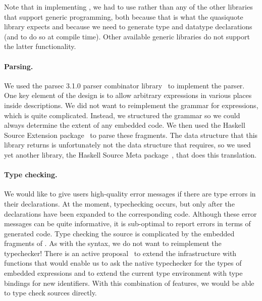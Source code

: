 Note that in implementing \forest{}, we had to use \template{}
rather than any of the other libraries that support generic programming,
both because that is what the quasiquote library expects and
because we need to generate type and datatype declarations (and to do
so at compile time).  
Other available generic libraries do not support the latter functionality.

\paragraph{Parsing.}  
We used the parsec 3.1.0 parser
combinator library~\cite{LeijenMeijer:parsec} to implement the \forest{} parser.  One key element
of the \forest{} design is to allow arbitrary \haskell{} expressions
in various places inside \forest{} descriptions.  We did not want to
reimplement the grammar for \haskell{} expressions, which is quite
complicated.  Instead, we structured the \forest{} grammar so we could
always determine the extent of any embedded \haskell{} code.  We then
used the Haskell Source Extension package~\cite{haskell-src-exts} to parse
these fragments.  The data structure that this library returns is
unfortunately not the data structure that \template{} requires, so we
used yet another library, the Haskell Source Meta
package~\cite{haskell-src-meta}, that does this translation. 


\paragraph{Type checking.}
We would like to give users high-quality error messages if there
are type errors in their \forest{} declarations.  At the moment, 
typechecking occurs, but only after the \forest{} declarations have
been expanded to the corresponding \haskell{} code.  Although these
error messages can be quite informative, it is sub-optimal to report
errors in terms of generated code.  Type checking the \forest{} source
is complicated by the embedded fragments of \haskell{}.  As with the
syntax, we do not want to reimplement the \haskell{} typechecker!  
There is an active proposal~\cite{extend-templates} to extend the \template{} infrastructure
with functions that would enable us to ask the native \haskell{}
typechecker for the types of embedded expressions and to extend the
current type environment with type bindings for new identifiers.  With
this combination of features, we would be able to type check \forest{}
sources directly.

